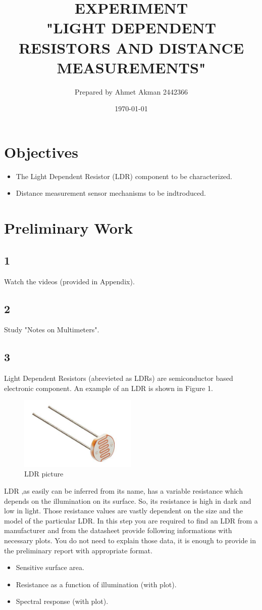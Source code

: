 \documentclass[letterpaper,12pt]{article}
\begin{document}
\title{EXPERIMENT\protect\\"LIGHT DEPENDENT RESISTORS AND DISTANCE MEASUREMENTS"}
\author{Prepared by Ahmet Akman 2442366}
\date{\today}
\maketitle
\section*{Objectives}
\begin{itemize}
	\item The Light Dependent Resistor (LDR) component to be characterized.
	\item Distance measurement sensor mechanisms to be indtroduced.
\end{itemize}
\section*{Preliminary Work}
\subsection*{1}
Watch the  videos (provided in Appendix).
\subsection*{2}
Study "Notes on Multimeters".
\subsection*{3}
Light Dependent Resistors (abrevieted as LDRs) are semiconductor based electronic component. An example of an LDR is shown in Figure 1. 
\begin{figure}[H]
	\centering
	\includegraphics[width=0.5\textwidth]{LDR_photo.png}
	\caption{LDR picture}
\end{figure} 
LDR ,as easily can be inferred from its name, has a variable resistance which depends on the illumination on its surface. So, its resistance is high in dark and low in light. Those resistance values are vastly dependent on the size and the model of the particular LDR. In this step you are required to find an LDR from a manufacturer and from the datasheet provide following informations with necessary plots. You do not need to explain those data, it is enough to provide in the preliminary report with appropriate format.
\begin{itemize}
	\item Sensitive surface area.
	\item Resistance as a function of illumination (with plot).
	\item Spectral response (with plot). 
\end{itemize}   
\end{document}
